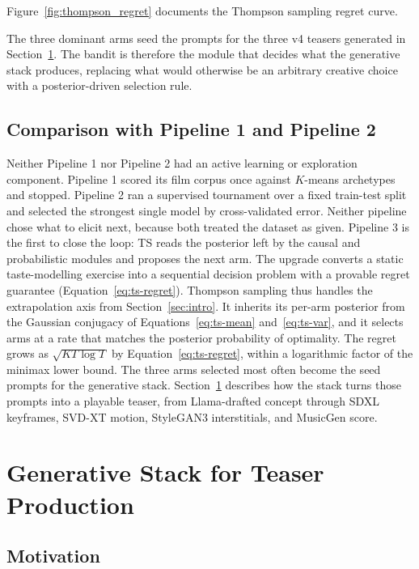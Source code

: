 \documentclass{article}
\begin{document}
Figure~\ref{fig:thompson_regret} documents the Thompson sampling regret curve.

The three dominant arms seed the prompts for the three v4 teasers generated in Section~\ref{sec:gen}. The bandit is therefore the module that decides what the generative stack produces, replacing what would otherwise be an arbitrary creative choice with a posterior-driven selection rule.

\subsection{Comparison with Pipeline 1 and Pipeline 2}

Neither Pipeline 1 nor Pipeline 2 had an active learning or exploration component. Pipeline 1 scored its film corpus once against $K$-means archetypes and stopped. Pipeline 2 ran a supervised tournament over a fixed train-test split and selected the strongest single model by cross-validated error. Neither pipeline chose what to elicit next, because both treated the dataset as given. Pipeline 3 is the first to close the loop: TS reads the posterior left by the causal and probabilistic modules and proposes the next arm. The upgrade converts a static taste-modelling exercise into a sequential decision problem with a provable regret guarantee (Equation~\ref{eq:ts-regret}). Thompson sampling thus handles the extrapolation axis from Section~\ref{sec:intro}. It inherits its per-arm posterior from the Gaussian conjugacy of Equations~\ref{eq:ts-mean} and~\ref{eq:ts-var}, and it selects arms at a rate that matches the posterior probability of optimality. The regret grows as $\sqrt{KT\log T}$ by Equation~\ref{eq:ts-regret}, within a logarithmic factor of the minimax lower bound. The three arms selected most often become the seed prompts for the generative stack. Section~\ref{sec:gen} describes how the stack turns those prompts into a playable teaser, from Llama-drafted concept through SDXL keyframes, SVD-XT motion, StyleGAN3 interstitials, and MusicGen score.

\section{Generative Stack for Teaser Production}
\label{sec:gen}

\subsection{Motivation}
\end{document}
